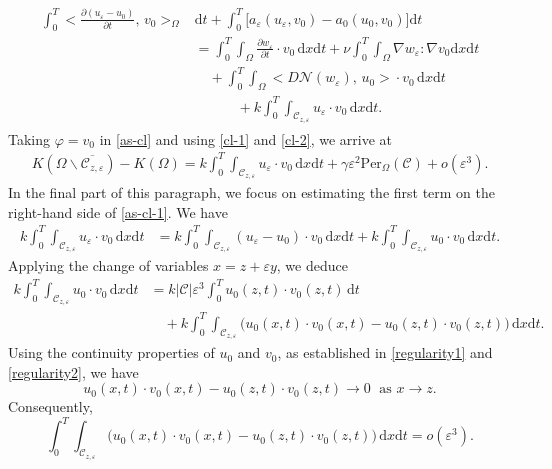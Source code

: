 \documentclass[a4paper,12pt,reqno,natbib]{amsart}
\newcommand{\dx} {\displaystyle\mathrm{d}x}
\newcommand{\dt} {\displaystyle\mathrm{d}t}
\def\N{\mathcal N}
\begin{document}
\begin{align}
\begin{split}\label{cl-2}
    \int_0^T\big<\frac{\partial (u_\varepsilon-u_0)}{\partial t},\, v_0\big>_\Omega&\dt+\int_0^T \big[a_\varepsilon(u_\varepsilon,v_0)-a_0(u_0,v_0)\big]\dt\\
    &=\int_0^{T}\int_{\Omega}\frac {\partial w_\varepsilon}{\partial t}\cdot v_0\, \dx\dt+\nu\int_0^{T}\int_\Omega\nabla w_\varepsilon:\nabla v_0\dx\dt\\
    &\quad+\int_0^T\int_\Omega\big<D\N(w_\varepsilon),\,u_0\big>\cdot v_0\,\dx\dt\\
&\qquad\quad+k\int_0^{T}\int_{\mathcal{C}_{z,\varepsilon}}u_\varepsilon\cdot v_0\,\dx\dt.
\end{split}
\end{align} 
Taking \( \varphi = v_0 \) in \eqref{as-cl} and using \eqref{cl-1} and \eqref{cl-2}, we arrive at
\begin{align}\label{as-cl-1}
 K(\Omega\backslash\overline{\mathcal{C}_{z,\varepsilon}})-K(\Omega)=k\int_0^{T}\int_{\mathcal{C}_{z,\varepsilon}}u_\varepsilon\cdot v_0\,\dx\dt+\gamma\varepsilon^{2}\text{Per}_\Omega(\mathcal{C})+o(\varepsilon^3).
\end{align}
In the final part of this paragraph, we focus on estimating the first term on the right-hand side of \eqref{as-cl-1}. We have
\begin{align*}
   k\int_0^{T}\int_{\mathcal{C}_{z,\varepsilon}} u_\varepsilon\cdot v_0 \,\dx\dt
   &= k\int_0^{T}\int_{\mathcal{C}_{z,\varepsilon}} (u_\varepsilon - u_0) \cdot v_0 \,\dx\dt 
   + k\int_0^{T}\int_{\mathcal{C}_{z,\varepsilon}} u_0 \cdot v_0 \,\dx\dt.
\end{align*}
Applying the change of variables \( x = z + \varepsilon y \), we deduce
\begin{align*}
    k\int_0^{T}\int_{\mathcal{C}_{z,\varepsilon}} u_0 \cdot v_0 \,\dx\dt
    &= k |\mathcal{C}| \varepsilon^3 \int_0^T u_0(z,t) \cdot v_0(z,t) \,\dt \\
    &\quad + k  \int_0^T \int_{\mathcal{C}_{z,\varepsilon}} 
    \big( u_0(x,t) \cdot v_0(x,t) - u_0(z,t) \cdot v_0(z,t) \big) \,\dx\dt.
\end{align*}
Using the continuity properties of $u_0$ and $v_0$, as established in \eqref{regularity1} and \eqref{regularity2}, we have
\[u_0(x,t) \cdot v_0(x,t) - u_0(z,t) \cdot v_0(z,t) \longrightarrow0\; \text{  as  } x\to z.\]
Consequently, 
\[
  \int_0^T \int_{\mathcal{C}_{z,\varepsilon}} 
    \big( u_0(x,t) \cdot v_0(x,t) - u_0(z,t) \cdot v_0(z,t) \big) \,\dx\dt = o(\varepsilon^3).
\]
\end{document}
